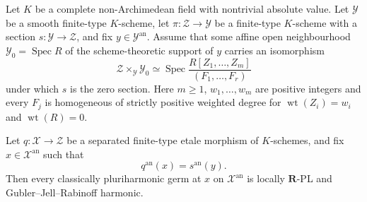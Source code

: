 \begin{theorem}
\label{thm:p061-algebraic-etale-weighted-cone-zero-section}
Let \(K\) be a complete non-Archimedean field with nontrivial absolute
value.  Let \(\mathcal Y\) be a smooth finite-type \(K\)-scheme, let
\(\pi:\mathcal Z\to\mathcal Y\) be a finite-type \(K\)-scheme with a
section \(s:\mathcal Y\to\mathcal Z\), and fix
\(y\in\mathcal Y^{\mathrm{an}}\).
Assume that some affine open neighbourhood
\(\mathcal Y_0=\operatorname{Spec}R\) of the scheme-theoretic support of
\(y\) carries an isomorphism
\[
 \mathcal Z\times_{\mathcal Y}\mathcal Y_0
 \simeq
 \operatorname{Spec}
 \frac{R[Z_1,\ldots,Z_m]}{(F_1,\ldots,F_r)}                         \tag{\(*\)}
\]
under which \(s\) is the zero section.  Here \(m\geq1\),
\(w_1,\ldots,w_m\) are
positive integers and every \(F_j\) is homogeneous of strictly positive
weighted degree for \(\operatorname{wt}(Z_i)=w_i\) and
\(\operatorname{wt}(R)=0\).

Let \(q:\mathcal X\to\mathcal Z\) be a separated finite-type etale
morphism of \(K\)-schemes, and fix \(x\in\mathcal X^{\mathrm{an}}\) such that
\[
                  q^{\mathrm{an}}(x)=s^{\mathrm{an}}(y).
\]
Then every classically pluriharmonic germ at \(x\) on
\(\mathcal X^{\mathrm{an}}\) is locally \(\mathbf R\)-PL and
Gubler--Jell--Rabinoff harmonic.
\end{theorem}
